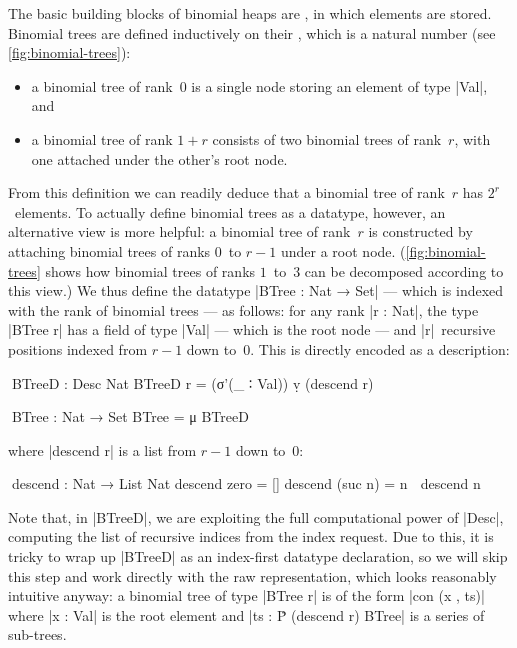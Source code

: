 The basic building blocks of binomial heaps are , in which elements are stored.
Binomial trees are defined inductively on their , which is a natural number (see \autoref{fig:binomial-trees}):
\begin{itemize}
\item a binomial tree of rank~$0$ is a single node storing an element of type |Val|, and
\item a binomial tree of rank $1+r$ consists of two binomial trees of rank~$r$, with one attached under the other's root node.
\end{itemize}
From this definition we can readily deduce that a binomial tree of rank~$r$ has $2^r$~elements.
To actually define binomial trees as a datatype, however, an alternative view is more helpful: a binomial tree of rank~$r$ is constructed by attaching binomial trees of ranks $0$~to $r-1$ under a root node.
(\autoref{fig:binomial-trees} shows how binomial trees of ranks $1$~to~$3$ can be decomposed according to this view.)
We thus define the datatype |BTree : Nat → Set| --- which is indexed with the rank of binomial trees --- as follows: for any rank |r : Nat|, the type |BTree r| has a field of type |Val| --- which is the root node --- and |r|~recursive positions indexed from $r-1$ down to~$0$.
This is directly encoded as a description:
\begin{code}
^^^BTreeD : Desc Nat
BTreeD r = (σ'(_ ∶ Val)) ṿ (descend r)

^^^BTree : Nat → Set
BTree = μ BTreeD
\end{code}
where |descend r| is a list from $r-1$ down to~$0$:
\begin{code}
^^^descend : Nat → List Nat
descend zero     =  []
descend (suc n)  =  n ∷ descend n
\end{code}
Note that, in |BTreeD|, we are exploiting the full computational power of |Desc|, computing the list of recursive indices from the index request.
Due to this, it is tricky to wrap up |BTreeD| as an index-first datatype declaration, so we will skip this step and work directly with the raw representation, which looks reasonably intuitive anyway: a binomial tree of type |BTree r| is of the form |con (x , ts)| where |x : Val| is the root element and |ts : Ṗ (descend r) BTree| is a series of sub-trees.

